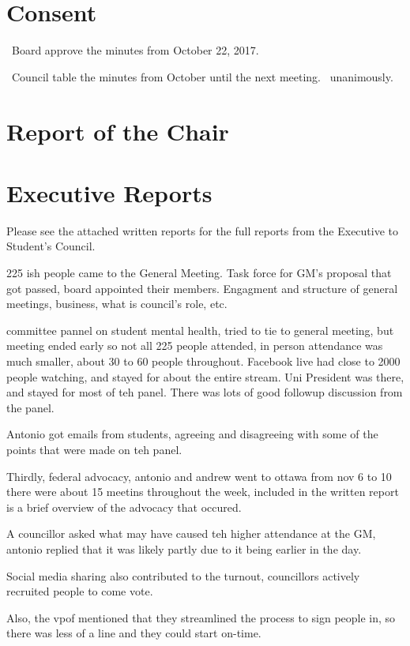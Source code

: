 \section*{Consent}

\begin{motion}
    \birt\ Board approve the minutes from October 22, 2017.

    \begin{motion}
        \birt\ Council table the minutes from October until the next meeting.
        \movers{\tristan}{\brian}
        \carries\ unanimously.
    \end{motion}
\end{motion}

\section*{Report of the Chair}

\section*{Executive Reports}

Please see the attached written reports for the full reports from the Executive
to Student's Council. 

\begin{information}
    225 ish people came to the General Meeting. Task force  for GM's proposal that got 
    passed, board appointed their members. Engagment and structure of 
    general meetings, business, what is council's role, etc. 

    committee pannel on student mental health, tried to tie to general 
    meeting, but meeting ended early so not all 225 people attended, in
    person attendance was much smaller, about 30 to 60 people throughout. 
    Facebook live had close to 2000 people watching, and stayed for about
    the entire stream. Uni President was there, and stayed for most of teh
    panel. There was lots of good followup discussion from the panel.

    Antonio got emails from students, agreeing and disagreeing with some of the
    points that were made on teh panel.

    Thirdly, federal advocacy, antonio and andrew went to ottawa from nov 6 to 10 
    there were about 15 meetins throughout the week, included in the written
    report is a brief overview of the advocacy that occured. 


    A councillor asked what may have caused teh higher attendance at the GM,
    antonio replied that it was likely partly due to it being earlier in 
    the day. 

    Social media sharing also contributed to the turnout, councillors actively
    recruited people to come vote.

    Also, the vpof mentioned that they streamlined the process to sign people
    in, so there was less of a line and they could start on-time.

\end{information}

